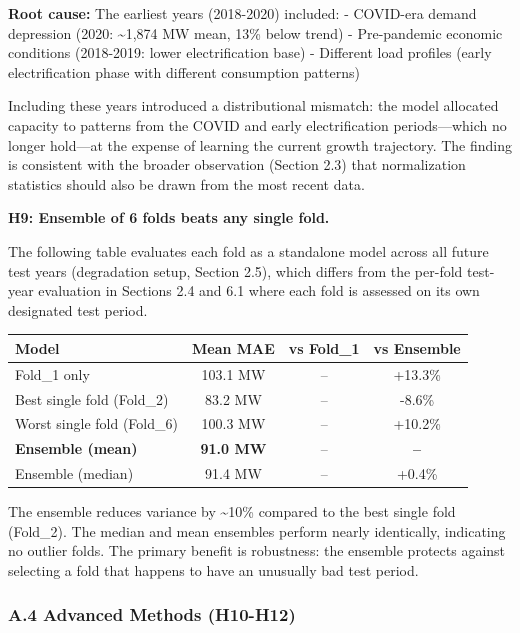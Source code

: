 \textbf{Root cause:} The earliest years (2018-2020) included: -
COVID-era demand depression (2020: \textasciitilde1,874 MW mean, 13\%
below trend) - Pre-pandemic economic conditions (2018-2019: lower
electrification base) - Different load profiles (early electrification
phase with different consumption patterns)

Including these years introduced a distributional mismatch: the model
allocated capacity to patterns from the COVID and early electrification
periods---which no longer hold---at the expense of learning the current
growth trajectory. The finding is consistent with the broader
observation (Section 2.3) that normalization statistics should also be
drawn from the most recent data.

\textbf{H9: Ensemble of 6 folds beats any single fold.}

The following table evaluates each fold as a standalone model across all
future test years (degradation setup, Section 2.5), which differs from
the per-fold test-year evaluation in Sections 2.4 and 6.1 where each
fold is assessed on its own designated test period.

{\def\LTcaptype{none} %
\begin{longtable}[]{@{}lccc@{}}
\toprule\noalign{}
Model & Mean MAE & vs Fold\_1 & vs Ensemble \\
\midrule\noalign{}
\endhead
\bottomrule\noalign{}
\endlastfoot
Fold\_1 only & 103.1 MW & -- & +13.3\% \\
Best single fold (Fold\_2) & 83.2 MW & -- & -8.6\% \\
Worst single fold (Fold\_6) & 100.3 MW & -- & +10.2\% \\
\textbf{Ensemble (mean)} & \textbf{91.0 MW} & -- & \textbf{--} \\
Ensemble (median) & 91.4 MW & -- & +0.4\% \\
\end{longtable}
}

The ensemble reduces variance by \textasciitilde10\% compared to the
best single fold (Fold\_2). The median and mean ensembles perform nearly
identically, indicating no outlier folds. The primary benefit is
robustness: the ensemble protects against selecting a fold that happens
to have an unusually bad test period.

\subsubsection{A.4 Advanced Methods
(H10-H12)}\label{a.4-advanced-methods-h10-h12}

